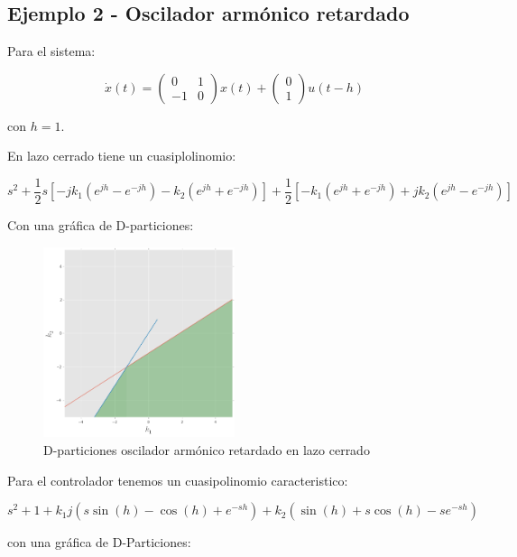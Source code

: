 \documentclass{article}
\begin{document}
    \subsection{Ejemplo 2 - Oscilador armónico
retardado}\label{ejemplo-2---oscilador-armuxf3nico-retardado}

    Para el sistema:

\[
\dot{x}(t) =
\begin{pmatrix}
0 & 1 \\
-1 & 0
\end{pmatrix}
x(t) +
\begin{pmatrix}
0 \\
1
\end{pmatrix}
u(t - h)
\]

con \(h = 1\).

    En lazo cerrado tiene un cuasiplolinomio:

\[
s^2 + \frac{1}{2} s\left[ -j k_1 \left( e^{jh} - e^{-jh} \right) - k_2 \left( e^{jh} + e^{-jh} \right) \right] + \frac{1}{2} \left[ -k_1 \left( e^{jh} + e^{-jh} \right) + j k_2 \left( e^{jh} - e^{-jh} \right) \right]
\]

Con una gráfica de D-particiones:

\begin{figure}[htbp]
\centering
\includegraphics[width=0.5\textwidth]{../imagenes/oscarmlc.png}
\caption{D-particiones oscilador armónico retardado en lazo cerrado}
\end{figure}

    Para el controlador tenemos un cuasipolinomio caracteristico:

\[
s^2 + 1 + k_1 j \left( s \sin{(h)} - \cos{(h)} + e^{-sh} \right) + k_2 \left( \sin{(h)} + s \cos{(h)} - s e^{-sh} \right)
\]

con una gráfica de D-Particiones:
\end{document}

